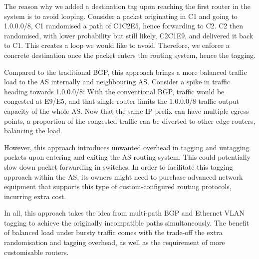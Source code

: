 \documentclass[12pt]{article}
\begin{document}
The reason why we added a destination tag upon reaching the first router in the system is to avoid looping. Consider a packet originating in C1 and going to 1.0.0.0/8, C1 randomised a path of C1\textrightarrow{}C2\textrightarrow{}E5, hence forwarding to C2. C2 then randomised, with lower probability but still likely, C2\textrightarrow{}C1\textrightarrow{}E9, and delivered it back to C1. This creates a loop we would like to avoid. Therefore, we enforce a concrete destination once the packet enters the routing system, hence the tagging.

Compared to the traditional BGP, this approach brings a more balanced traffic load to the AS internally and neighbouring AS. Consider a spike in traffic heading towards 1.0.0.0/8: With the conventional BGP, traffic would be congested at E9/E5, and that single router limits the 1.0.0.0/8 traffic output capacity of the whole AS. Now that the same IP prefix can have multiple egress points, a proportion of the congested traffic can be diverted to other edge routers, balancing the load.

However, this approach introduces unwanted overhead in tagging and untagging packets upon entering and exiting the AS routing system. This could potentially slow down packet forwarding in switches. In order to facilitate this tagging approach within the AS, its owners might need to purchase advanced network equipment that supports this type of custom-configured routing protocols, incurring extra cost.

In all, this approach takes the idea from multi-path BGP and Ethernet VLAN tagging to achieve the originally incompatible paths simultaneously. The benefit of balanced load under bursty traffic comes with the trade-off the extra randomisation and tagging overhead, as well as the requirement of more customisable routers.
\end{document}
